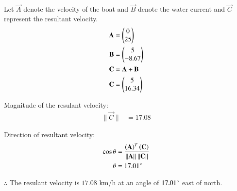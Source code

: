 \solution Let $\vec{A}$ denote the velocity of the boat and $
\vec{B}$ denote the water current and $\vec{C}$ represent the resultant velocity. 
\begin{align}
\mathbf{A} &=\begin{pmatrix}0\\25\end{pmatrix} \label{eq:constr_a}\\
\mathbf{B} &=\begin{pmatrix}5\\-8.67\end{pmatrix} \label{eq:constr_b}\\
\mathbf{C} &= \mathbf{A} + \mathbf{B}\\
\mathbf{C} &= \begin{pmatrix}5\\16.34\end{pmatrix}
\end{align}

Magnitude of the resulant velocity:
\begin{align}
\| \vec{C} \| &= 17.08
\end{align}

Direction of resultant velocity:
\begin{align}
\cos{\theta} &= \frac{\brak{\vec{A}}^T\brak{\vec{C}}}{\| \vec{A} \|\ \| \vec{C} \|}\\
\theta &= 17.01\degree
\end{align}

\begin{flushleft}
$\therefore$ The resulant velocity is $17.08$ km/h at an angle of $17.01\degree$ east of north.
\end{flushleft}





